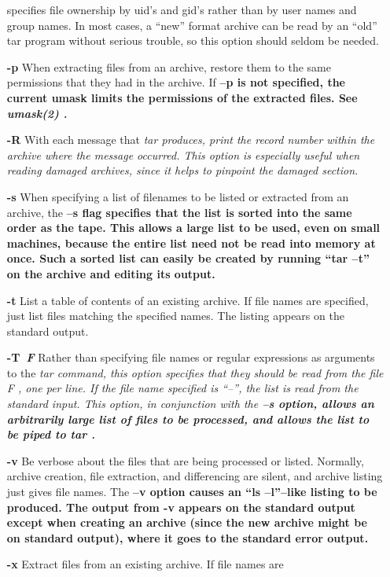 \begin{itemize}
specifies file ownership by uid's and gid's rather than by
user names and group names.  In most cases, a ``new'' format archive
can be read by an ``old'' tar program without serious trouble, so this
option should seldom be needed.
\item[{\bf -p\rm}]
When extracting files from an archive, restore them to the same permissions
that they had in the archive.  If %
\bf --p \rm%
 is not specified, the current
umask limits the permissions of the extracted files.  See %
\it umask(2)\rm%
.
\item[{\bf -R\rm}]
With each message that %
\it tar \rm%
 produces, print the record number
within the archive where the message occurred.  This option is especially
useful when reading damaged archives, since it helps to pinpoint the damaged
section.
\item[{\bf -s\rm}]
When specifying a list of filenames to be listed
or extracted from an archive,
the %
\bf --s \rm%
 flag specifies that the list
is sorted into the same order as the tape.  This allows a large list
to be used, even on small machines, because
the entire list need not be read into memory at once.  Such a sorted
list can easily be created by running ``tar --t'' on the archive and
editing its output.
\item[{\bf -t\rm}]
List a table of contents of an existing archive.  If file names are
specified, just list files matching the specified names.  The listing
appears on the standard output.
\item[{\bf -T\rm\ \it F\rm}]
Rather than specifying file names or regular expressions as arguments to
the %
\it tar \rm%
 command, this option specifies that they should
be read from the file %
\it F\rm%
, one per line.
If the file name specified is ``--'',
the list is read from the standard input.
This option, in conjunction with the %
\bf --s \rm%
 option,
allows an arbitrarily large list of files to be processed, 
and allows the list to be piped to %
\it tar\rm%
.
\item[{\bf -v\rm}]
Be verbose about the files that are being processed or listed.  Normally,
archive creation, file extraction, and differencing are silent,
and archive listing just
gives file names.  The %
\bf --v \rm%
 option causes an ``ls --l''--like listing
to be produced.  The output from -v appears on the standard output except
when creating an archive (since the new archive might be on standard output),
where it goes to the standard error output.
\item[{\bf -x\rm}]
Extract files from an existing archive.  If file names are

\end{itemize}
